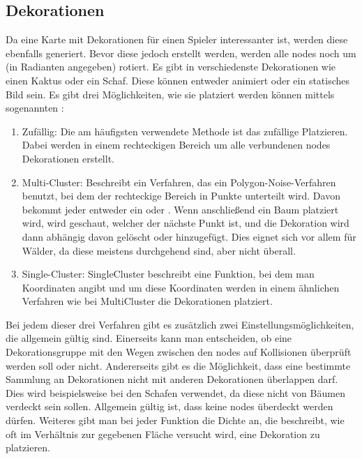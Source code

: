 \subsection{Dekorationen}\label{subsec:dekorationen}
Da eine Karte mit Dekorationen für einen Spieler interessanter ist, werden diese ebenfalls generiert.
Bevor diese jedoch erstellt werden, werden alle nodes noch um  (in Radianten angegeben) rotiert.
Es gibt in \FF verschiedenste Dekorationen wie einen Kaktus oder ein Schaf.
Diese können entweder animiert oder ein statisches Bild sein.
Es gibt drei Möglichkeiten, wie sie platziert werden können mittels sogenannten :
\begin{enumerate}
    \item Zufällig: Die am häufigsten verwendete Methode ist das zufällige Platzieren.
    Dabei werden in einem rechteckigen Bereich um alle verbundenen nodes Dekorationen erstellt.
    \item Multi-Cluster: Beschreibt ein Verfahren, das ein Polygon-Noise-Verfahren benutzt, bei dem der rechteckige Bereich in Punkte unterteilt wird.
    Davon bekommt jeder entweder ein  oder .
    Wenn anschließend ein Baum platziert wird, wird geschaut, welcher der nächste Punkt ist, und die Dekoration wird dann abhängig davon gelöscht oder hinzugefügt.
    Dies eignet sich vor allem für \zB Wälder, da diese meistens durchgehend sind, aber nicht überall.
    \item Single-Cluster: SingleCluster beschreibt eine Funktion, bei dem man Koordinaten angibt und um diese Koordinaten werden in einem ähnlichen Verfahren wie bei MultiCluster die Dekorationen platziert.
\end{enumerate}

Bei jedem dieser drei Verfahren gibt es zusätzlich zwei Einstellungsmöglichkeiten, die allgemein gültig sind.
Einerseits kann man entscheiden, ob eine Dekorationsgruppe mit den Wegen zwischen den nodes auf Kollisionen überprüft werden soll oder nicht.
Andererseits gibt es die Möglichkeit, dass eine bestimmte Sammlung an Dekorationen nicht mit anderen Dekorationen überlappen darf.
Dies wird beispielsweise bei den Schafen verwendet, da diese nicht von Bäumen verdeckt sein sollen.
Allgemein gültig ist, dass keine nodes überdeckt werden dürfen.
Weiteres gibt man bei jeder Funktion die Dichte an, die beschreibt, wie oft im Verhältnis zur gegebenen Fläche versucht wird, eine Dekoration zu platzieren.